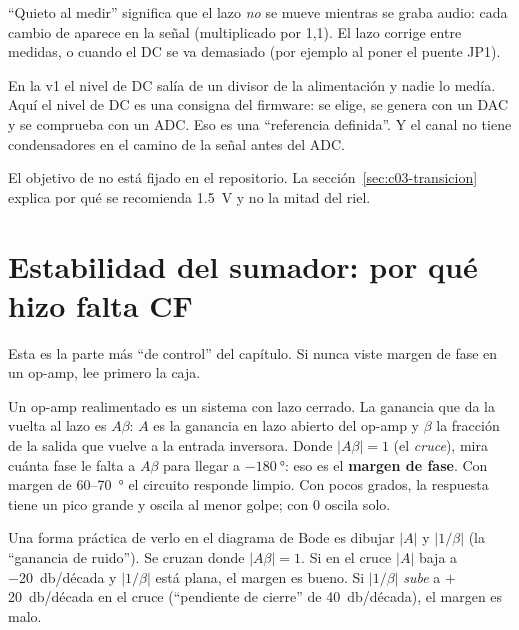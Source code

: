 ``Quieto al medir'' significa que el lazo \emph{no} se mueve mientras se graba audio: cada cambio de 
aparece en la señal (multiplicado por 1,1). El lazo corrige entre medidas, o cuando el DC se va demasiado (por
ejemplo al poner el puente JP1).

\begin{idea}
En la v1 el nivel de DC salía de un divisor de la alimentación y nadie lo medía. Aquí el nivel de DC es una consigna
del firmware: se elige, se genera con un DAC y se comprueba con un ADC. Eso es una ``referencia definida''. Y el canal
no tiene condensadores en el camino de la señal antes del ADC.
\end{idea}

El objetivo de  no está fijado en el repositorio. La sección~\ref{sec:c03-transicion} explica por qué se
recomienda \SI{1.5}{\volt} y no la mitad del riel.

\section{Estabilidad del sumador: por qué hizo falta CF}\label{sec:c03-cf}

Esta es la parte más ``de control'' del capítulo. Si nunca viste margen de fase en un op-amp, lee primero la caja.

\begin{idea}
Un op-amp realimentado es un sistema con lazo cerrado. La ganancia que da la vuelta al lazo es $A\beta$: $A$ es la
ganancia en lazo abierto del op-amp y $\beta$ la fracción de la salida que vuelve a la entrada inversora. Donde
$|A\beta| = 1$ (el \emph{cruce}), mira cuánta fase le falta a $A\beta$ para llegar a $-\SI{180}{\degree}$: eso es el
\textbf{margen de fase}. Con margen de 60–\SI{70}{\degree} el circuito responde limpio. Con pocos grados, la
respuesta tiene un pico grande y oscila al menor golpe; con 0 oscila solo.

Una forma práctica de verlo en el diagrama de Bode es dibujar $|A|$ y $|1/\beta|$ (la ``ganancia de ruido''). Se
cruzan donde $|A\beta| = 1$. Si en el cruce $|A|$ baja a \SI{-20}{\decibel}/década y $|1/\beta|$ está plana, el margen
es bueno. Si $|1/\beta|$ \emph{sube} a $+$\SI{20}{\decibel}/década en el cruce (``pendiente de cierre'' de
\SI{40}{\decibel}/década), el margen es malo.
\end{idea}

